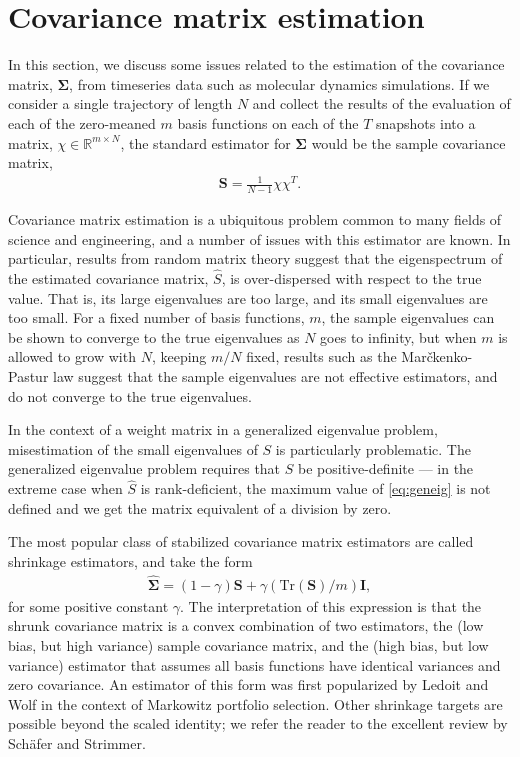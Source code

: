 \documentclass[aip, jcp, reprint, nolinenumbers, twocolumn, nobalancelastpage, nofootinbib]{revtex4-1}
\begin{document}
\appendix
\section{Covariance matrix estimation}
\label{appendix:covariance}

In this section, we discuss some issues related to the estimation of the covariance matrix, $\mathbf{\Sigma}$, from timeseries data such as molecular dynamics simulations. If we consider a single trajectory of length $N$ and collect the results of the evaluation of each of the zero-meaned $m$ basis functions on each of the $T$ snapshots into a matrix, $\chi \in \mathbb{R}^{m \times N}$, the standard estimator for $\mathbf{\Sigma}$ would be the sample covariance matrix,
\begin{align}
    \mathbf{S} = \frac{1}{N-1} \chi \chi^T.
\end{align}

Covariance matrix estimation is a ubiquitous problem common to many fields of science and engineering, and a number of issues with this estimator are known. In particular, results from random matrix theory suggest that the eigenspectrum of the estimated covariance matrix, $\hat{S}$, is over-dispersed with respect to the true value. That is, its large eigenvalues are too large, and its small eigenvalues are too small. For a fixed number of basis functions, $m$, the sample eigenvalues can be shown to converge to the true eigenvalues as $N$ goes to infinity,\cite{anderson1963} but when $m$ is allowed to grow with $N$, keeping $m/N$ fixed, results such as the Mar\v{c}kenko-Pastur law suggest that the sample eigenvalues are not effective estimators, and do not converge to the true eigenvalues.\cite{johnstone2001}

In the context of a weight matrix in a generalized eigenvalue problem, misestimation of the small eigenvalues of $S$ is particularly problematic. The generalized eigenvalue problem requires that $S$ be positive-definite --- in the extreme case when $\hat{S}$ is rank-deficient, the maximum value of \cref{eq:geneig} is not defined and we get the matrix equivalent of a division by zero.

The most popular class of stabilized covariance matrix estimators are called shrinkage estimators, and take the form
\begin{align}
\hat{\mathbf{\Sigma}} = (1-\gamma)\mathbf{S} + \gamma  (\mathrm{Tr}(\mathbf{S}) / m) \mathbf{I},
\end{align}
for some positive constant $\gamma$. The interpretation of this expression is that the shrunk covariance matrix is a convex combination of two estimators, the (low bias, but high variance) sample covariance matrix, and the (high bias, but low variance) estimator that assumes all basis functions have identical variances and zero covariance. An estimator of this form was first popularized by Ledoit and Wolf in the context of Markowitz portfolio selection.\cite{ledoit2003improved, ledoit2004well, markowitz1952portfolio} Other shrinkage targets are possible beyond the scaled identity; we refer the reader to the excellent review by Sch\"{a}fer and Strimmer.\cite{schafer2005shrinkage}
\end{document}
